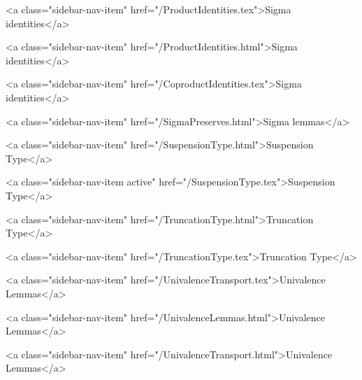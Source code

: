       
    
      
        
          <a class="sidebar-nav-item" href="/ProductIdentities.tex">Sigma identities</a>
        
      
    
      
        
          <a class="sidebar-nav-item" href="/ProductIdentities.html">Sigma identities</a>
        
      
    
      
        
          <a class="sidebar-nav-item" href="/CoproductIdentities.tex">Sigma identities</a>
        
      
    
      
        
          <a class="sidebar-nav-item" href="/SigmaPreserves.html">Sigma lemmas</a>
        
      
    
      
        
          <a class="sidebar-nav-item" href="/SuspensionType.html">Suspension Type</a>
        
      
    
      
        
          <a class="sidebar-nav-item active" href="/SuspensionType.tex">Suspension Type</a>
        
      
    
      
        
          <a class="sidebar-nav-item" href="/TruncationType.html">Truncation Type</a>
        
      
    
      
        
          <a class="sidebar-nav-item" href="/TruncationType.tex">Truncation Type</a>
        
      
    
      
        
          <a class="sidebar-nav-item" href="/UnivalenceTransport.tex">Univalence Lemmas</a>
        
      
    
      
        
          <a class="sidebar-nav-item" href="/UnivalenceLemmas.html">Univalence Lemmas</a>
        
      
    
      
        
          <a class="sidebar-nav-item" href="/UnivalenceTransport.html">Univalence Lemmas</a>
        
